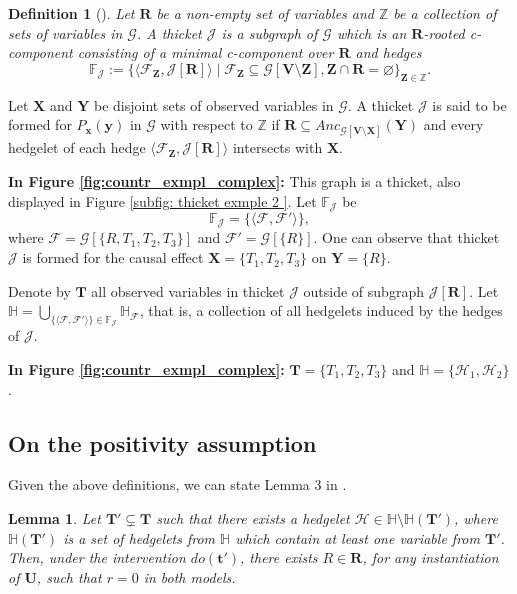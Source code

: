\documentclass[accepted]{uai2022}
\newtheorem{definition}{Definition}
\newtheorem*{lemma*}{Lemma}
\newcommand{\Anc}[2]{\textit{Anc}_{#2}(#1)}
\newcommand{\V}[0]{\mathbf{V}}
\newcommand{\U}[0]{\mathbf{U}}
\newcommand{\X}[0]{\mathbf{X}}
\newcommand{\R}[0]{\mathbf{R}}
\newcommand{\Y}[0]{\mathbf{Y}}
\newcommand{\Z}[0]{\mathbf{Z}}
\newcommand{\T}[0]{\mathbf{T}}
\newcommand{\G}[0]{\mathcal{G}}
\newcommand{\F}[0]{\mathcal{F}}
\begin{document}
        \begin{definition}[\citep{lee2019general}]
            Let $\mathbf{R}$ be a non-empty set of variables and $\mathbb{Z}$ be a collection of sets of variables in $\G$. A thicket $\mathcal{J}$ is a subgraph of $\G$ which is an $\mathbf{R}$-rooted c-component consisting of a minimal c-component over $\mathbf{R}$ and hedges
            \begin{equation*}
                \mathbb{F}_{\mathcal{J}} := \{\langle \F_{\Z}, \mathcal{J}[\R]\rangle \mid \F_{\Z} \subseteq \G[\V\setminus\Z], \Z\cap \R=\varnothing\}_{\Z\in \mathbb{Z}}.
            \end{equation*}
        \end{definition}
        Let $\X$ and $\Y$ be disjoint sets of observed variables in $\G$. A thicket $\mathcal{J}$ is said to be formed for $P_{\mathbf{x}}(\mathbf{y})$ in $\G$ with respect to $\mathbb{Z}$ if $\R \subseteq \Anc{\Y}{\G[\V \setminus \X]}$ and every hedgelet of each hedge $\langle \F_{\Z}, \mathcal{J}[\R]\rangle$ intersects with $\X$.
        
        \textbf{In Figure \ref{fig:countr_exmpl_complex}:} This graph is a thicket, also displayed in Figure \ref{subfig: thicket exmple 2 }.  Let $\mathbb{F_{\mathcal{J}}}$ be
        \begin{equation*}
            \mathbb{F_{\mathcal{J}}} = \{\langle \F, \F'\rangle \},
        \end{equation*}
        where $\F = \G[\{R, T_1, T_2, T_3\}]$ and $\F' = \G[\{R\}]$.
        One can observe that thicket $\mathcal{J}$ is formed for the causal effect $\X = \{T_1, T_2, T_3\}$ on $\Y = \{R\}$.
        
        Denote by $\T$ all observed variables in thicket $\mathcal{J}$ outside of subgraph $\mathcal{J}[\R]$. Let $\mathbb{H} = \bigcup_{\{\langle \F, \F'\rangle \}\in \mathbb{F}_{\mathcal{J}}}\mathbb{H}_{\F}$, that is, a collection of all hedgelets induced by the hedges of $\mathcal{J}$.
        
        \textbf{In Figure \ref{fig:countr_exmpl_complex}:} $\T = \{T_1, T_2, T_3\}$ and $\mathbb{H} = \{\mathcal{H}_1, \mathcal{H}_2\}$.

    \subsection{On the positivity assumption} \label{apn: pos assumption simple}
        Given the above definitions, we can state Lemma 3 in \citep{lee2019general}.
        \begin{lemma*}
            Let $\T'\subsetneq \T$ such that there exists a hedgelet $\mathcal{H} \in \mathbb{H}\setminus\mathbb{H}(\T')$, where $\mathbb{H}(\T')$ is a set of hedgelets from $\mathbb{H}$ which contain at least one variable from $\textbf{T}'$. Then, under the intervention $do(\mathbf{t}')$, there exists $R \in \R$, for any instantiation of $\U$, such that $r=0$ in both models.
        \end{lemma*}
\end{document}
